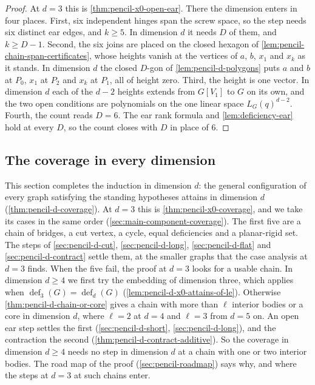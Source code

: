 \begin{proof}
  At $d = 3$ this is \cref{thm:pencil-x0-open-ear}. There the dimension
  enters in four places. First, six independent hinges span the screw
  space, so the step needs six distinct ear edges, and $k \ge 5$. In
  dimension $d$ it needs $D$ of them, and $k \ge D - 1$. Second, the six
  joins are placed on the closed hexagon of
  \cref{lem:pencil-chain-span-certificates}, whose heights vanish at the
  vertices of $a$, $b$, $x_1$ and $x_k$ as it stands. In dimension $d$
  the closed $D$-gon of \cref{lem:pencil-d-polygons} puts $a$ and $b$ at
  $P_0$, $x_1$ at $P_2$ and $x_k$ at $P_1$, all of height zero. Third,
  the height is one vector. In dimension $d$ each of the $d - 2$ heights
  extends from $G[V_1]$ to $G$ on its own, and the two open conditions
  are polynomials on the one linear space $L_G(q)^{d-2}$. Fourth, the
  count reads $D = 6$. The ear rank formula and
  \cref{lem:deficiency-ear} hold at every $D$, so the count closes with
  $D$ in place of $6$.
\end{proof}

\subsection{The coverage in every dimension}
\label{sec:pencil-d-coverage}

This section completes the induction in dimension $d$: the general
configuration of every graph satisfying the standing hypotheses attains
in dimension $d$ (\cref{thm:pencil-d-coverage}). At $d = 3$ this is
\cref{thm:pencil-x0-coverage}, and we take its cases in the same order
(\cref{sec:main-component-coverage}). The first five are a chain of
bridges, a cut vertex, a cycle, equal deficiencies and a planar-rigid
set. The steps of \cref{sec:pencil-d-cut}, \cref{sec:pencil-d-long},
\cref{sec:pencil-d-flat} and \cref{sec:pencil-d-contract} settle them,
at the smaller graphs that the case analysis at $d = 3$ finds. When the
five fail, the proof at $d = 3$ looks for a usable chain. In dimension
$d \ge 4$ we first try the embedding of dimension three, which applies
when $\operatorname{def}_3(G) = \operatorname{def}_d(G)$
(\cref{lem:pencil-d-x0-attains-of-le}). Otherwise
\cref{thm:pencil-d-chain-or-core} gives a chain with more than $\ell$
interior bodies or a core in dimension $d$, where $\ell = 2$ at $d = 4$
and $\ell = 3$ from $d = 5$ on. An open ear step settles the first
(\cref{sec:pencil-d-short}, \cref{sec:pencil-d-long}), and the
contraction the second (\cref{thm:pencil-d-contract-additive}). So the
coverage in dimension $d \ge 4$ needs no step in dimension $d$ at a chain
with one or two interior bodies. The road map of the proof
(\cref{sec:pencil-roadmap}) says why, and where the steps at $d = 3$ at
such chains enter.

